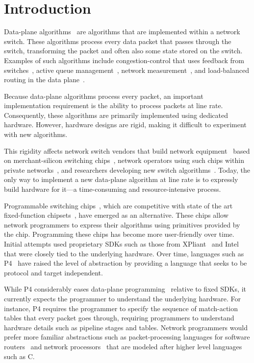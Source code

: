 \section{Introduction}
\label{s:intro}

Data-plane algorithms~\cite{cestan} are algorithms that are implemented within
a network switch. These algorithms process every data packet that passes
through the switch, transforming the packet and often also some state stored on
the switch.  Examples of such algorithms include congestion-control that uses
feedback from switches~\cite{xcp, rcp, pdq, dctcp}, active queue
management~\cite{codel}, network measurement~\cite{opensketch, bitmap_george,
elephant_george}, and load-balanced routing in the data plane~\cite{conga}.

Because data-plane algorithms process every packet, an important implementation
requirement is the ability to process packets at line rate.  Consequently,
these algorithms are primarily implemented using dedicated hardware. However,
hardware designs are rigid, making it difficult to experiment with new
algorithms.

This rigidity affects network switch vendors that build network
equipment~\cite{cisco_nexus, dell_force10, arista_7050} based on
merchant-silicon switching chips~\cite{trident, tomahawk, mellanox}, network
operators using such chips within private networks~\cite{google,facebook,vl2},
and researchers developing new switch algorithms~\cite{xcp, codel, d3, detail,
pdq}. Today, the only way to implement a new data-plane algorithm at line rate
is to expressly build hardware for it---a time-consuming and resource-intensive
process.

Programmable switching chips~\cite{flexpipe, xpliant, rmt}, which are
competitive with state of the art fixed-function chipsets~\cite{trident,
tomahawk, mellanox}, have emerged as an alternative.  These chips allow network
programmers to express their algorithms using primitives provided by the chip.
Programming these chips has become more user-friendly over time. Initial
attempts used proprietary SDKs such as those from XPliant~\cite{xpliant_sdk,
xpliant_sdk2} and Intel~\cite{intel_sdk} that were closely tied to the
underlying hardware.  Over time, languages such as P4~\cite{p4, p4spec} have
raised the level of abstraction by providing a language that seeks to be
protocol and target independent.

While P4 considerably eases data-plane programming~\cite{dc_p4} relative to
fixed SDKs, it currently expects the programmer to understand the underlying
hardware. For instance, P4 requires the programmer to specify the
sequence of match-action tables that every packet goes through, requiring
programmers to understand hardware details such as pipeline stages and tables.
Network programmers would prefer more familiar abstractions such as
packet-processing languages for software routers~\cite{click} and network
processors~\cite{packetc, nova} that are modeled after higher level languages
such as C.

